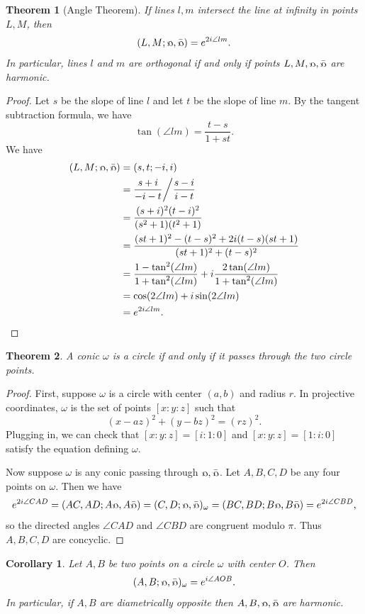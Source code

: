 \documentclass[letterpaper,11pt]{article}
\newtheorem{thm}{Theorem}
\newtheorem{cor}{Corollary}
\theoremstyle{definition}
\theoremstyle{remark}
\begin{document}
\begin{thm}[Angle Theorem] If lines $l, m$ intersect the line at infinity in points $L,M$, then
\[
(L,M;\fish,\bar\fish) = e^{2i\angle lm}.
\]
In particular, lines $l$ and $m$ are orthogonal if and only if points $L,M,\fish,\bar\fish$ are harmonic.
\end{thm}
\begin{proof} Let $s$ be the slope of line $l$ and let $t$ be the slope of line $m$. By the tangent subtraction formula, we have
\[
\tan(\angle lm) = \frac{t-s}{1+st}.
\]
We have
\begin{align*}
(L,M;\fish,\bar\fish) &= (s,t;-i,i)\\
&= \frac{s+i}{-i-t}\bigg/\frac{s-i}{i-t}\\
&= \frac{(s+i)^2(t-i)^2}{(s^2+1)(t^2+1)}\\
&= \frac{(st+1)^2 - (t-s)^2 + 2i(t-s)(st+1)}{(st+1)^2 + (t-s)^2}\\
&= \frac{1-\tan^2(\angle lm)}{1+\tan^2(\angle lm)} + i\frac{2\tan(\angle lm)}{1+\tan^2(\angle lm)}\\
&= \cos(2\angle lm) + i\sin(2\angle lm)\\
&= e^{2i\angle lm}.\qedhere
\end{align*}
\end{proof}

\begin{thm} A conic $\omega$ is a circle if and only if it passes through the two circle points.
\end{thm}
\begin{proof} First, suppose $\omega$ is a circle with center $(a,b)$ and radius $r$. In projective coordinates, $\omega$ is the set of points $[x:y:z]$ such that
\[
(x-az)^2 + (y-bz)^2 = (rz)^2.
\]
Plugging in, we can check that $[x:y:z] = [i:1:0]$ and $[x:y:z] = [1:i:0]$ satisfy the equation defining $\omega$.

Now suppose $\omega$ is any conic passing through $\fish,\bar\fish$. Let $A,B,C,D$ be any four points on $\omega$. Then we have
\[
e^{2i\angle CAD} = (AC,AD;A\fish,A\bar\fish) = (C,D;\fish,\bar\fish)_{\omega} = (BC,BD;B\fish,B\bar\fish) = e^{2i\angle CBD},
\]
so the directed angles $\angle CAD$ and $\angle CBD$ are congruent modulo $\pi$. Thus $A,B,C,D$ are concyclic.
\end{proof}

\begin{cor} Let $A,B$ be two points on a circle $\omega$ with center $O$. Then
\[
(A,B;\fish,\bar\fish)_\omega = e^{i\angle AOB}.
\]
In particular, if $A,B$ are diametrically opposite then $A,B,\fish,\bar\fish$ are harmonic.
\end{cor}
\end{document}
